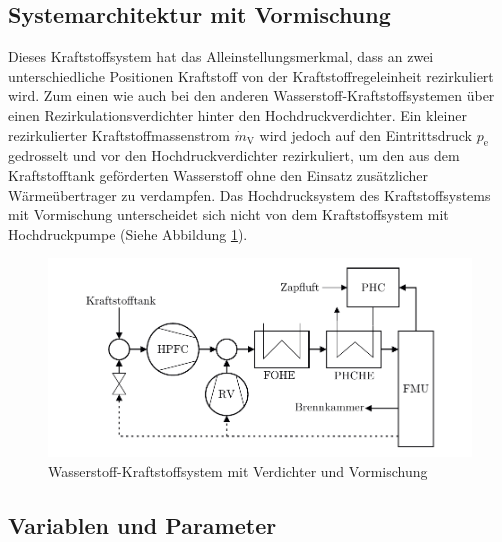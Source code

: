 \subsection{Systemarchitektur mit Vormischung}

Dieses Kraftstoffsystem hat das Alleinstellungsmerkmal, dass an zwei unterschiedliche Positionen Kraftstoff von der Kraftstoffregeleinheit rezirkuliert wird. Zum einen wie auch bei den anderen Wasserstoff-Kraftstoffsystemen über einen Rezirkulationsverdichter hinter den Hochdruckverdichter. Ein kleiner rezirkulierter Kraftstoffmassenstrom $\dot{m}_\mathrm{V}$ wird jedoch auf den Eintrittsdruck $p_\mathrm{e}$ gedrosselt und vor den Hochdruckverdichter rezirkuliert, um den aus dem Kraftstofftank geförderten Wasserstoff ohne den Einsatz zusätzlicher Wärmeübertrager zu verdampfen. Das Hochdrucksystem des Kraftstoffsystems mit Vormischung unterscheidet sich nicht von dem Kraftstoffsystem mit Hochdruckpumpe (Siehe Abbildung \ref{fig:vormischung}).

\begin{figure}[ht]
\centering
\includegraphics[width=1\linewidth]{4_Abbildungen/2_Hauptteil/Kraftstoffsystem Abbildungen/dual.pdf}
  \caption{Wasserstoff-Kraftstoffsystem mit Verdichter und Vormischung}
  \label{fig:vormischung}
\end{figure}
\FloatBarrier 

\subsection{Variablen und Parameter}


